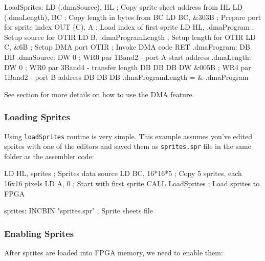 \begin{tcblisting}{}
LoadSprites:
	LD (.dmaSource), HL     ; Copy sprite sheet address from HL
	LD (.dmaLength), BC     ; Copy length in bytes from BC
	LD BC, &303B            ; Prepare port for sprite index
	OUT (C), A              ; Load index of first sprite
	LD HL, .dmaProgram      ; Setup source for OTIR
	LD B, .dmaProgramLength ; Setup length for OTIR
	LD C, &6B               ; Setup DMA port
	OTIR                    ; Invoke DMA code
	RET
.dmaProgram:
	DB %
	DB %
.dmaSource:
	DW 0                    ; WR0 par 1Band2 - port A start address
.dmaLength:
	DW 0                    ; WR0 par 3Band4 - transfer length
	DB %
	DB %
	DB %
	DW &005B                ; WR4 par 1Band2 - port B address
	DB %
	DB %
	DB %
.dmaProgramLength = &-.dmaProgram
\end{tcblisting}

See section  for more details on how to use the DMA feature.


\pagebreak
\subsubsection{Loading Sprites}

Using {\tt loadSprites} routine is very simple. This example assumes you've edited sprites with one of the editors and saved them as {\tt sprites.spr} file in the same folder as the assembler code:

\begin{tcblisting}{}
	LD HL, sprites          ; Sprites data source
	LD BC, 16*16*5          ; Copy 5 sprites, each 16x16 pixels
	LD A, 0                 ; Start with first sprite
	CALL LoadSprites        ; Load sprites to FPGA

sprites:
	INCBIN "sprites.spr"    ; Sprite sheets file
\end{tcblisting}


\subsubsection{Enabling Sprites}

After sprites are loaded into FPGA memory, we need to enable them:

